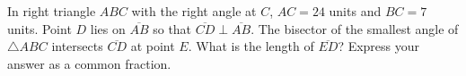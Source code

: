 In right triangle $ABC$ with the right angle at $C$, $AC=24$ units and $BC=7$ units. Point $D$ lies on $\overline{AB}$ so that $\overline{CD}\perp\overline{AB}$. The bisector of the smallest angle of $\triangle ABC$ intersects $\overline{CD}$ at point $E$. What is the length of $\overline{ED}$? Express your answer as a common fraction.
